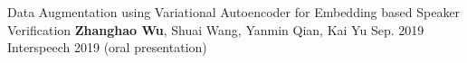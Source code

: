 


\begin{cventries}


\cvpublication
{Data Augmentation using Variational Autoencoder for Embedding based Speaker Verification}
{\textbf{Zhanghao Wu}, Shuai Wang, Yanmin Qian, Kai Yu}
{Sep. 2019}
{Interspeech 2019 (oral presentation)}


\end{cventries}